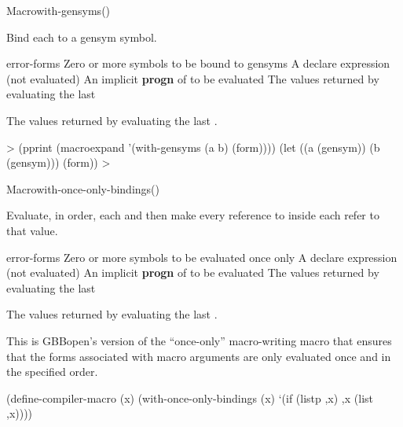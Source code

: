 \documentclass[10pt,twoside,english,pdftex]{article}
\begin{document}
\begin{functiondoc}{Macro}{with-gensyms}{(\superstar{})
    \superstar{}
    \superstar{}
    \returns{} \superstar{}}
\fnsyntax

\fnpurpose Bind each  to a gensym symbol.

\fnpackage {}

\fnmodule {}

\fnargs
\begin{args}{error-forms}
\arg[symbols] Zero or more symbols to be bound to gensyms
\arg[declaration] A declare expression (not evaluated)
\arg[forms] An implicit \textbf{progn} of  to be evaluated
\arg[results] The values returned by evaluating the last 
\end{args}

\fnreturns The values returned by evaluating the last .

\fnexamples
%
\W\supp
\begin{example}
  > (pprint (macroexpand '(with-gensyms (a b) (form))))
  (let ((a (gensym))
        (b (gensym)))
    (form))
  >
\end{example}

\end{functiondoc}


\begin{functiondoc}{Macro}{with-once-only-bindings}{(\superstar{})
    \superstar{}
    \superstar{} 
    \returns{} \superstar{}}

\fnsyntax

\fnpurpose Evaluate, in order, each  and then make every
reference to  inside each  refer to that
value.

\fnpackage {}

\fnmodule {}

\fnargs
\begin{args}{error-forms}
\arg[symbols] Zero or more symbols to be evaluated once only
\arg[declaration] A declare expression (not evaluated)
\arg[forms] An implicit \textbf{progn} of  to be evaluated
\arg[results] The values returned by evaluating the last 
\end{args}

\fnreturns The values returned by evaluating the last .

\fndescription This is GBBopen's version of the ``once-only'' macro-writing
macro that ensures that the forms associated with macro arguments are
only evaluated once and in the specified order.

%
\fnexample
%
\W\supp
\begin{example}
  (define-compiler-macro  (x)
    (with-once-only-bindings (x)
      `(if (listp ,x) ,x (list ,x))))
\end{example}

\end{functiondoc}
\end{document}

